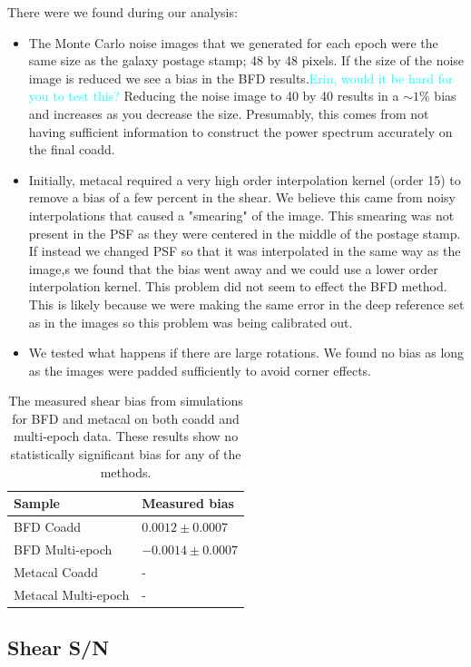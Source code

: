 \documentclass[fleqn,useAMS,usenatbib]{mnras}
\newcommand{\comment}[1]{{\textcolor{cyan}{#1}}}
\begin{document}
There were we found during our analysis:
\begin{itemize}
\item The Monte Carlo noise images that we generated for each epoch were the same size as the galaxy postage stamp; 48 by 48 pixels.  If the size of the noise image is reduced we see a bias in the BFD results.\comment{Erin, would it be hard for you to test this?}  Reducing the noise image to 40 by 40 results in a $\sim 1\%$ bias and increases as you decrease the size.  Presumably, this comes from not having sufficient information to construct the power spectrum accurately on the final coadd.
\item Initially, metacal required a very high order interpolation kernel (order 15) to remove a bias of a few percent in the shear.  We believe this came from noisy interpolations that caused a "smearing" of the image.  This smearing was not present in the PSF as they were centered in the middle of the postage stamp.  If instead we changed PSF so that it was interpolated in the same way as the image,s we found that the bias went away and we could use a lower order interpolation kernel.  This problem did not seem to effect the BFD method.  This is likely because we were making the same error in the deep reference set as in the images so this problem was being calibrated out.
\item We tested what happens if there are large rotations.  We found no bias as long as the images were padded sufficiently to avoid corner effects.
\end{itemize}

\begin{table}
\begin{tabular}{ll}
\hline
Sample & Measured bias \\ \hline
BFD Coadd & $0.0012 \pm 0.0007$ \\
BFD Multi-epoch & $-0.0014 \pm 0.0007$ \\
Metacal Coadd & -  \\
Metacal Multi-epoch & -  \\ \hline
\end{tabular}
\caption{The measured shear bias from simulations for BFD and metacal on both coadd and multi-epoch data.  These results show no statistically significant bias for any of the methods.}
\label{tab:results}
\end{table}

\subsection{Shear S/N}
\end{document}
